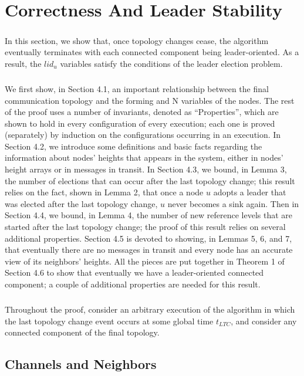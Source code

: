 \chapter{Correctness And Leader Stability}
\paragraph{}In this section, we show that, once topology changes cease, the algorithm eventually terminates with each connected component being leader-oriented. As a result, the $lid_u$ variables satisfy the conditions of the leader election problem.
\paragraph{}We first show, in Section 4.1, an important relationship between the final communication topology and the forming and N variables of the nodes. The rest of the proof uses a number of invariants, denoted as “Properties”, which are shown to hold in every configuration of every execution; each one is proved (separately) by induction on the configurations occurring in an execution. In Section 4.2, we introduce some definitions and basic facts regarding the information about nodes' heights that appears in the system, either in nodes' height arrays or in messages in transit. In Section 4.3, we bound, in Lemma 3, the number of elections that can occur after the last topology change; this result relies on the fact, shown in Lemma 2, that once a node $u$ adopts a leader that was elected after the last topology change, $u$ never becomes a sink again. Then in Section 4.4, we bound, in Lemma 4, the number of new reference levels that are started after the last topology change; the proof of this result relies on several additional properties. Section 4.5 is devoted to showing, in Lemmas 5, 6, and 7, that eventually there are no messages in transit and every node has an accurate view of its neighbors' heights. All the pieces are put together in Theorem 1 of Section 4.6 to show that eventually we have a leader-oriented connected component; a couple of additional properties are needed for this result.
\paragraph{}Throughout the proof, consider an arbitrary execution of the algorithm in which the last topology change event occurs at some global time $t_{LTC}$, and consider any connected component of the final topology.
\section{Channels and Neighbors}
